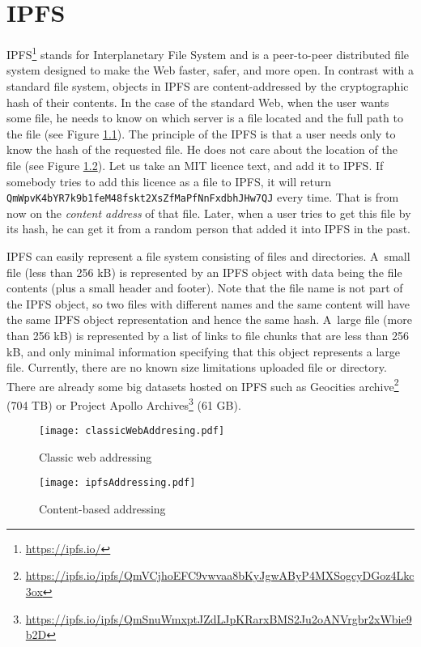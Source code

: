 \chapter{IPFS}
\label{ipfs}

IPFS\footnote{\url{https://ipfs.io/}} stands for Interplanetary File System and is a peer-to-peer distributed file system designed to make the Web faster, safer, and more open. In contrast with a standard file system, objects in IPFS are content-addressed by the cryptographic hash of their contents. In the case of the standard Web, when the user wants some file, he needs to know on which server is a file located and the full path to the file (see Figure \ref{webAddressing}). The principle of the IPFS is that a user needs only to know the hash of the requested file. He does not care about the location of the file (see Figure \ref{ipfsAddressing}). Let us take an MIT licence text, and add it to IPFS. If somebody tries to add this licence as a file to IPFS, it will return \texttt{QmWpvK4bYR7k9b1feM48fsk\-t2XsZfMaPfNnFxdbhJHw7QJ} every time. That is from now on the \textit{content address} of that file. Later, when a user tries to get this file by its hash, he can get it from a random person that added it into IPFS in the past.

IPFS can easily represent a file system consisting of files and directories. A~small file (less than 256 kB) is represented by an IPFS object with data being the file contents (plus a small header and footer). Note that the file name is not part of the IPFS object, so two files with different names and the same content will have the same IPFS object representation and hence the same hash. A~large file (more than 256 kB) is represented by a list of links to file chunks that are less than 256 kB, and only minimal information specifying that this object represents a large file. Currently, there are no known size limitations uploaded file or directory. There are already some big datasets hosted on IPFS such as Geocities archive\footnote{\url{https://ipfs.io/ipfs/QmVCjhoEFC9vwvaa8bKyJgwAByP4MXSogcyDGoz4Lkc3ox}} (704 TB) or Project Apollo Archives\footnote{\url{https://ipfs.io/ipfs/QmSnuWmxptJZdLJpKRarxBMS2Ju2oANVrgbr2xWbie9b2D}} (61 GB).


\begin{figure}[h]
    \centering
    \texttt{[image: classicWebAddresing.pdf]}
    \caption{Classic web addressing}
    \label{webAddressing}
\end{figure}

\begin{figure}[h]
    \centering
    \texttt{[image: ipfsAddressing.pdf]}
    \caption{Content-based addressing}
    \label{ipfsAddressing}
\end{figure}

